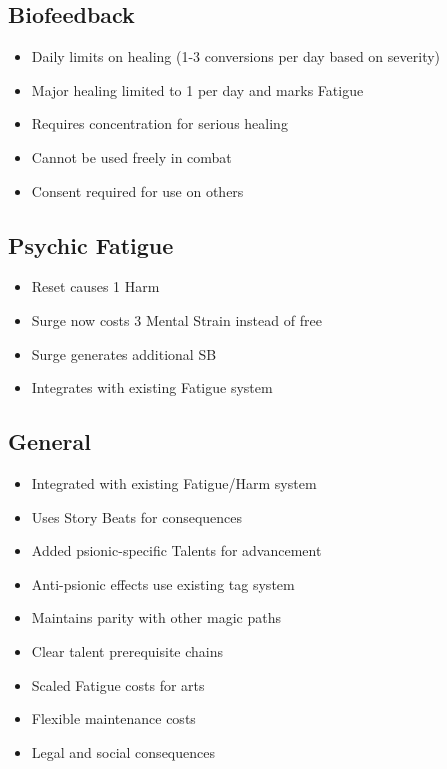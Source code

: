 \documentclass[11pt,twoside]{article}
\begin{document}
\subsection*{Biofeedback}
\begin{itemize}[leftmargin=*]
    \item Daily limits on healing (1-3 conversions per day based on severity)
    \item Major healing limited to 1 per day and marks Fatigue
    \item Requires concentration for serious healing
    \item Cannot be used freely in combat
    \item Consent required for use on others
\end{itemize}

\subsection*{Psychic Fatigue}
\begin{itemize}[leftmargin=*]
    \item Reset causes 1 Harm
    \item Surge now costs 3 Mental Strain instead of free
    \item Surge generates additional SB
    \item Integrates with existing Fatigue system
\end{itemize}

\subsection*{General}
\begin{itemize}[leftmargin=*]
    \item Integrated with existing Fatigue/Harm system
    \item Uses Story Beats for consequences
    \item Added psionic-specific Talents for advancement
    \item Anti-psionic effects use existing tag system
    \item Maintains parity with other magic paths
    \item Clear talent prerequisite chains
    \item Scaled Fatigue costs for arts
    \item Flexible maintenance costs
    \item Legal and social consequences
\end{itemize}
\end{document}
